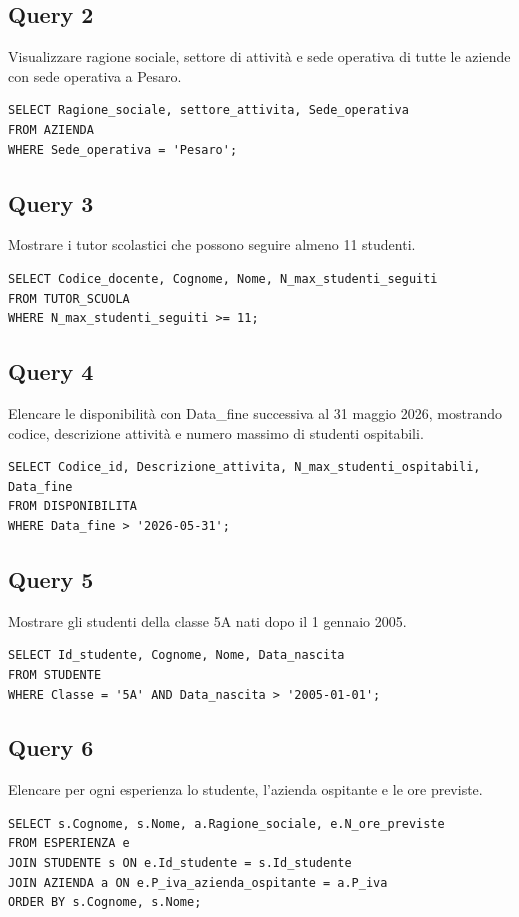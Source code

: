 \documentclass[a4paper,12pt]{article}
\begin{document}
\subsection*{Query 2}Visualizzare ragione sociale, settore di attività e sede operativa di tutte le aziende con sede operativa a Pesaro.
\begin{lstlisting}
SELECT Ragione_sociale, settore_attivita, Sede_operativa
FROM AZIENDA
WHERE Sede_operativa = 'Pesaro';
\end{lstlisting}
\subsection*{Query 3}Mostrare i tutor scolastici che possono seguire almeno 11 studenti.
\begin{lstlisting}
SELECT Codice_docente, Cognome, Nome, N_max_studenti_seguiti
FROM TUTOR_SCUOLA
WHERE N_max_studenti_seguiti >= 11;
\end{lstlisting}
\subsection*{Query 4}Elencare le disponibilità con Data\_fine successiva al 31 maggio 2026, mostrando codice, descrizione attività e numero massimo di studenti ospitabili.
\begin{lstlisting}
SELECT Codice_id, Descrizione_attivita, N_max_studenti_ospitabili, Data_fine
FROM DISPONIBILITA
WHERE Data_fine > '2026-05-31';
\end{lstlisting}
\subsection*{Query 5}Mostrare gli studenti della classe 5A nati dopo il 1 gennaio 2005.
\begin{lstlisting}
SELECT Id_studente, Cognome, Nome, Data_nascita
FROM STUDENTE
WHERE Classe = '5A' AND Data_nascita > '2005-01-01';
\end{lstlisting}
\subsection*{Query 6}Elencare per ogni esperienza lo studente, l'azienda ospitante e le ore previste.
\begin{lstlisting}
SELECT s.Cognome, s.Nome, a.Ragione_sociale, e.N_ore_previste
FROM ESPERIENZA e
JOIN STUDENTE s ON e.Id_studente = s.Id_studente
JOIN AZIENDA a ON e.P_iva_azienda_ospitante = a.P_iva
ORDER BY s.Cognome, s.Nome;
\end{lstlisting}
\end{document}
